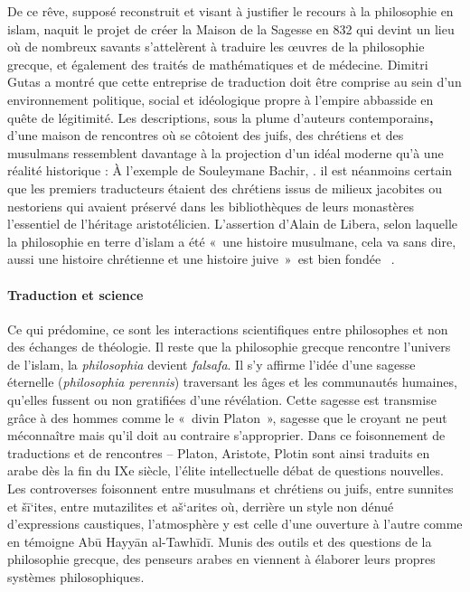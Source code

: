 De ce rêve, supposé reconstruit et visant à justifier le recours à la
philosophie en islam, naquit le projet de créer la Maison de la Sagesse
en 832 qui devint un lieu où de nombreux savants s'attelèrent à traduire
les œuvres de la philosophie grecque{,} et également {des}
traités de mathématiques et de médecine. Dimitri Gutas a montré que
cette entreprise de traduction doit être comprise au sein d'un
environnement politique, social et idéologique propre à l'empire
abbasside en quête de légitimité. Les
descriptions, sous la plume d'auteurs contemporains\textbf{,}
d'une maison de rencontres où se côtoient des juifs, des chrétiens et
des musulmans ressemblent davantage à la projection d'un idéal moderne
qu'à une réalité historique : À l'exemple de Souleymane Bachir,
 . il est néanmoins certain que les premiers traducteurs étaient des
  chrétiens issus de milieux jacobites ou nestoriens qui avaient
  préservé dans les bibliothèques de leurs monastères l'essentiel de
  l'héritage aristotélicien. L'assertion d'Alain de Libera, selon
  laquelle la philosophie en terre d'islam a été «~une histoire
  musulmane, cela va sans dire, aussi une histoire chrétienne et une
  histoire juive~»~est bien fondée~ . 
  
  \paragraph{Traduction et science} Ce qui prédomine,
ce sont les interactions scientifiques entre philosophes et non des
échanges de théologie. Il reste que la philosophie grecque rencontre
l'univers de l'islam, la \emph{philosophia} devient \emph{falsafa}. Il
s'y affirme l'idée d'une sagesse éternelle (\emph{philosophia perennis})
traversant les âges et les communautés humaines, qu'elles fussent ou non
gratifiées d'une révélation. Cette sagesse {est} transmise grâce
à des hommes comme le «~divin Platon~», sagesse que le croyant ne peut méconnaître
mais qu'il doit au contraire s'approprier. Dans ce foisonnement de
traductions et de rencontres -- Platon, Aristote, Plotin sont ainsi
traduits en arabe dès la fin du IXe siècle, l'élite intellectuelle débat
de questions nouvelles. Les controverses foisonnent entre musulmans et
chrétiens ou juifs, entre sunnites et šī`ites, entre mutazilites et
aš`arites où, derrière un style non dénué d'expressions caustiques,
l'atmosphère y est celle d'une ouverture à l'autre comme en témoigne Abū
Hayyān al-Tawhīdī.
Munis des outils et des questions de la philosophie grecque, des
penseurs arabes en viennent à élaborer leurs propres systèmes
philosophiques. 
